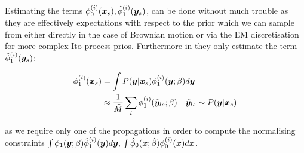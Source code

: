 \documentclass[a4paper,12pt,twoside,openright]{report}
\theoremstyle{definition}
\begin{document}
Estimating the terms $ \phi_0^{(i)}({\bm{x}}_s), {\hat{\phi}}_1^{(i)}({\bm{y}}_s)$, can be done without much trouble as they are effectively expectations with respect to the prior which we can sample from either directly in the case of Brownian motion or via the EM discretisation for more complex Ito-process prios. Furthermore in \cite{pavon1991free} they only estimate the term ${\hat{\phi}}_1^{(i)}({\bm{y}}_s)$:

\begin{align}\label{eq:pavon_transition_mc}
    \phi_1^{(i)}({\bm{x}}_s) &= \int P({\bm{y}}| {\bm{x}}_s) \phi_1^{(i)}({\bm{y}}; \beta) d{\bm{y}} \nonumber \\
    &\approx \frac{1}{\tilde{M}} \sum_l \phi_1^{(i)}(\tilde{{\bm{y}}}_{ls}; \beta) \quad \tilde{{\bm{y}}}_{ls} \sim   P({\bm{y}}| {\bm{x}}_s)
\end{align}

as we require only one of the propagations in order to compute the normalising constraints  $\int \phi_1({\bm{y}}; {\beta} )   {\hat{\phi}}_1^{(i)}({\bm{y}}) d{\bm{y}} , \, \int {\hat{\phi}}_0({\bm{x}}; \hat{\beta} )   \phi_0^{(i)}({\bm{x}}) d{\bm{x}} $.
\end{document}
